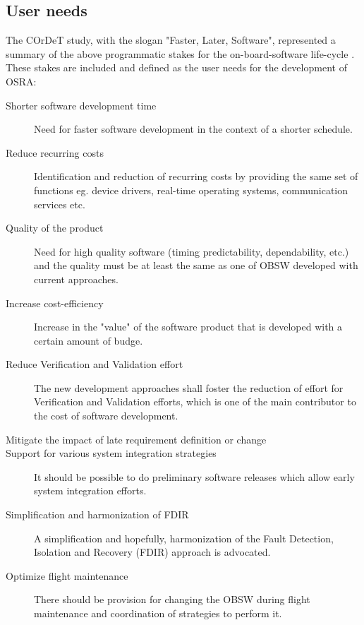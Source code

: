 \subsection{User needs}

The COrDeT study, with the slogan "Faster, Later, Software", represented a summary of the above programmatic stakes for the on-board-software life-cycle \cite{CORDET}\cite{SAVOIR}. These stakes are included and defined as the user needs \cite{SAVOIR} \cite{PhdThesis} for the development of OSRA:

\begin{description}
\item [Shorter software development time] Need for faster software development in the context of a shorter schedule.

\item [Reduce recurring costs] Identification and reduction of recurring costs by providing the same set of functions eg. device drivers, real-time operating systems, communication services etc.   

\item [Quality of the product] Need for high quality software (timing predictability, dependability, etc.) and the quality must be at least the same as one of OBSW developed with current approaches.

\item [Increase cost-efficiency] Increase in the "value" of the software product that is developed with a certain amount of budge.

\item [Reduce Verification and Validation effort] The new development approaches shall foster the reduction of effort for Verification and Validation efforts, which is one of the main contributor to the cost of software development.

\item [Mitigate the impact of late requirement definition or change] 

\item [Support for various system integration strategies] It should be possible to do preliminary software releases which allow early system integration efforts.

\item [Simplification and harmonization of FDIR] A simplification and hopefully, harmonization of the Fault Detection, Isolation and Recovery (FDIR) approach is advocated.

\item [Optimize flight maintenance] There should be provision for changing the OBSW during flight maintenance and coordination of strategies to perform it. 


\end{description}

